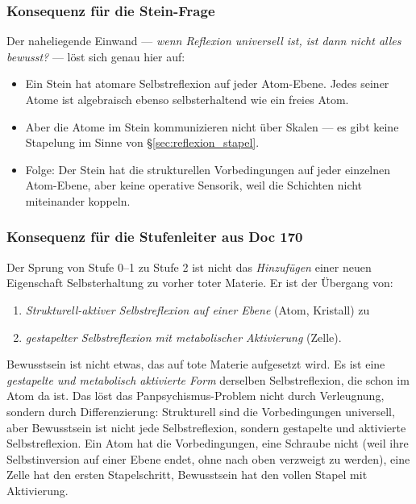 \subsubsection*{Konsequenz für die Stein-Frage}

Der naheliegende Einwand --- \emph{wenn Reflexion universell ist, ist dann nicht alles bewusst?} --- löst sich genau hier auf:

\begin{itemize}
\item Ein Stein hat atomare Selbstreflexion auf jeder Atom-Ebene. Jedes seiner Atome ist algebraisch ebenso \glqq selbsterhaltend\grqq{} wie ein freies Atom.
\item Aber die Atome im Stein kommunizieren nicht über Skalen --- es gibt keine Stapelung im Sinne von \S\ref{sec:reflexion_stapel}.
\item Folge: Der Stein hat die strukturellen Vorbedingungen auf jeder einzelnen Atom-Ebene, aber keine operative Sensorik, weil die Schichten nicht miteinander koppeln.
\end{itemize}

\subsubsection*{Konsequenz für die Stufenleiter aus Doc 170}

Der Sprung von Stufe 0--1 zu Stufe 2 ist nicht das \emph{Hinzufügen} einer neuen Eigenschaft \glqq Selbsterhaltung\grqq{} zu vorher \glqq toter\grqq{} Materie. Er ist der Übergang von:

\begin{enumerate}
\item \emph{Strukturell-aktiver Selbstreflexion auf einer Ebene} (Atom, Kristall) zu
\item \emph{gestapelter Selbstreflexion mit metabolischer Aktivierung} (Zelle).
\end{enumerate}

\begin{interpretation}
Bewusstsein ist nicht etwas, das auf tote Materie aufgesetzt wird. Es ist eine \emph{gestapelte und metabolisch aktivierte Form} derselben Selbstreflexion, die schon im Atom da ist. Das löst das Panpsychismus-Problem nicht durch Verleugnung, sondern durch Differenzierung: Strukturell sind die Vorbedingungen universell, aber \glqq Bewusstsein\grqq{} ist nicht jede Selbstreflexion, sondern gestapelte und aktivierte Selbstreflexion. Ein Atom hat die Vorbedingungen, eine Schraube nicht (weil ihre Selbstinversion auf einer Ebene endet, ohne nach oben verzweigt zu werden), eine Zelle hat den ersten Stapelschritt, Bewusstsein hat den vollen Stapel mit Aktivierung.
\end{interpretation}

